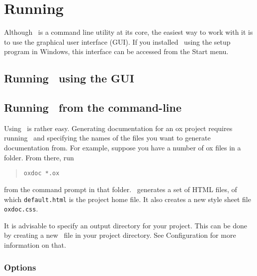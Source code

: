 \chapter{Running \oxdoc}
Although \oxdoc~is a command line utility at its core, the easiest way to work with it is to use
the graphical user interface (GUI).  If you installed \oxdoc~using the setup program in Windows, 
this interface can be accessed from the Start menu. 

\section{Running \oxdoc~using the GUI}

\section{Running \oxdoc~from the command-line}
Using \oxdoc~is rather easy. Generating documentation for an ox project
requires running \oxdoc~and specifying the names of the files you
want to generate documentation from. For example, suppose you have a number
of ox files in a folder. From there, run 
\begin{quote}
\tt oxdoc *.ox
\end{quote}

from the command prompt in that folder. \oxdoc~generates a set
of HTML files, of which {\tt default.html} is the project home file. It also
creates a new style sheet file {\tt oxdoc.css}.

It is advisable to specify an output directory for your project. This can
be done by creating a new \oxdocxml~file in your project directory. See 
Configuration for more information on that.


\subsection{Options}

